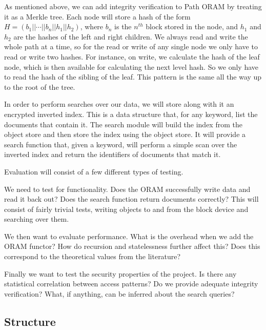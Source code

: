 \documentclass[12pt,a4paper,twoside]{article}
\begin{document}

As mentioned above, we can add integrity verification to Path ORAM by treating it as a Merkle tree. Each node will store a hash of the form $H = (b_1||\cdots||b_n||h_1||h_2)$, where $b_n$ is the $n^{th}$ block stored in the node, and $h_1$ and $h_2$ are the hashes of the left and right children. We always read and write the whole path at a time, so for the read or write of any single node we only have to read or write two hashes. For instance, on write, we calculate the hash of the leaf node, which is then available for calculating the next level hash. So we only have to read the hash of the sibling of the leaf. This pattern is the same all the way up to the root of the tree.


In order to perform searches over our data, we will store along with it an encrypted inverted index. This is a data structure that, for any keyword, list the documents that contain it. The search module will build the index from the object store and then store the index using the object store. It will provide a search function that, given a keyword, will perform a simple scan over the inverted index and return the identifiers of documents that match it.


Evaluation will consist of a few different types of testing. 

We need to test for functionality. Does the ORAM successfully write data and read it back out? Does the search function return documents correctly? This will consist of fairly trivial tests, writing objects to and from the block device and searching over them.

We then want to evaluate performance. What is the overhead when we add the ORAM functor? How do recursion and statelessness further affect this? Does this correspond to the theoretical values from the literature?

Finally we want to test the security properties of the project. Is there any statistical correlation between access patterns? Do we provide adequate integrity verification? What, if anything, can be inferred about the search queries?

\subsection*{Structure}
\end{document}
